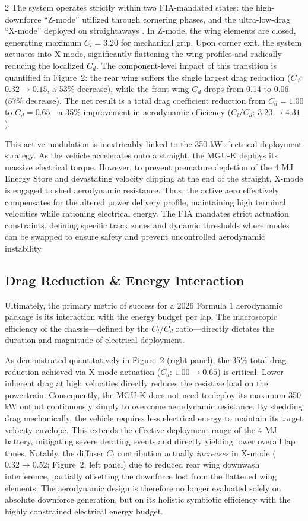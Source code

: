 \begin{multicols}{2}
The system operates strictly within two FIA-mandated states: the high-downforce ``Z-mode'' utilized through cornering phases, and the ultra-low-drag ``X-mode'' deployed on straightaways \cite{FIA_2026_Technical_Regulations}. In Z-mode, the wing elements are closed, generating maximum $C_l = 3.20$ for mechanical grip. Upon corner exit, the system actuates into X-mode, significantly flattening the wing profiles and radically reducing the localized $C_d$. The component-level impact of this transition is quantified in Figure~2: the rear wing suffers the single largest drag reduction ($C_d$: $0.32 \rightarrow 0.15$, a 53\% decrease), while the front wing $C_d$ drops from 0.14 to 0.06 (57\% decrease). The net result is a total drag coefficient reduction from $C_d = 1.00$ to $C_d = 0.65$—a 35\% improvement in aerodynamic efficiency ($C_l/C_d$: $3.20 \rightarrow 4.31$).

This active modulation is inextricably linked to the 350 kW electrical deployment strategy. As the vehicle accelerates onto a straight, the MGU-K deploys its massive electrical torque. However, to prevent premature depletion of the 4 MJ Energy Store and devastating velocity clipping at the end of the straight, X-mode is engaged to shed aerodynamic resistance. Thus, the active aero effectively compensates for the altered power delivery profile, maintaining high terminal velocities while rationing electrical energy. The FIA mandates strict actuation constraints, defining specific track zones and dynamic thresholds where modes can be swapped to ensure safety and prevent uncontrolled aerodynamic instability.

\subsection{Drag Reduction \& Energy Interaction}
Ultimately, the primary metric of success for a 2026 Formula 1 aerodynamic package is its interaction with the energy budget per lap. The macroscopic efficiency of the chassis—defined by the $C_l / C_d$ ratio—directly dictates the duration and magnitude of electrical deployment. 

As demonstrated quantitatively in Figure~2 (right panel), the 35\% total drag reduction achieved via X-mode actuation ($C_d$: $1.00 \rightarrow 0.65$) is critical. Lower inherent drag at high velocities directly reduces the resistive load on the powertrain. Consequently, the MGU-K does not need to deploy its maximum 350 kW output continuously simply to overcome aerodynamic resistance. By shedding drag mechanically, the vehicle requires less electrical energy to maintain its target velocity envelope. This extends the effective deployment range of the 4 MJ battery, mitigating severe derating events and directly yielding lower overall lap times. Notably, the diffuser $C_l$ contribution actually \emph{increases} in X-mode ($0.32 \rightarrow 0.52$; Figure~2, left panel) due to reduced rear wing downwash interference, partially offsetting the downforce lost from the flattened wing elements. The aerodynamic design is therefore no longer evaluated solely on absolute downforce generation, but on its holistic symbiotic efficiency with the highly constrained electrical energy budget.
\end{multicols}
